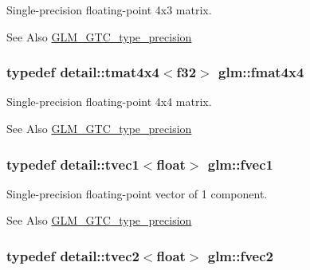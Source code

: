 Single-\/precision floating-\/point 4x3 matrix. 

\begin{DoxySeeAlso}{See Also}
\hyperlink{group__gtc__type__precision}{G\-L\-M\-\_\-\-G\-T\-C\-\_\-type\-\_\-precision} 
\end{DoxySeeAlso}
\hypertarget{group__gtc__type__precision_gad011717dba7e15802233b335618d8969}{
\subsubsection[{fmat4x4}]{\setlength{\rightskip}{0pt plus 5cm}typedef detail\-::tmat4x4$<$f32$>$ {\bf glm\-::fmat4x4}}}\label{group__gtc__type__precision_gad011717dba7e15802233b335618d8969}


Single-\/precision floating-\/point 4x4 matrix. 

\begin{DoxySeeAlso}{See Also}
\hyperlink{group__gtc__type__precision}{G\-L\-M\-\_\-\-G\-T\-C\-\_\-type\-\_\-precision} 
\end{DoxySeeAlso}
\hypertarget{group__gtc__type__precision_ga432dcb1d24c21c1b9fead0739a4af218}{
\subsubsection[{fvec1}]{\setlength{\rightskip}{0pt plus 5cm}typedef detail\-::tvec1$<$float$>$ {\bf glm\-::fvec1}}}\label{group__gtc__type__precision_ga432dcb1d24c21c1b9fead0739a4af218}


Single-\/precision floating-\/point vector of 1 component. 

\begin{DoxySeeAlso}{See Also}
\hyperlink{group__gtc__type__precision}{G\-L\-M\-\_\-\-G\-T\-C\-\_\-type\-\_\-precision} 
\end{DoxySeeAlso}
\hypertarget{group__gtc__type__precision_ga68722f27c558737659b1bd1eac4d1686}{
\subsubsection[{fvec2}]{\setlength{\rightskip}{0pt plus 5cm}typedef detail\-::tvec2$<$float$>$ {\bf glm\-::fvec2}}}\label{group__gtc__type__precision_ga68722f27c558737659b1bd1eac4d1686}


